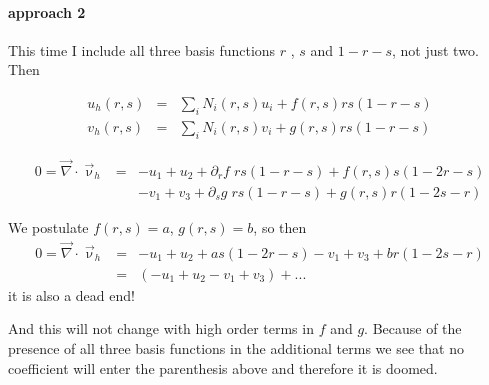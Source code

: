 \paragraph{approach 2} This time I include all three basis functions $r$ , $s$ and $1-r-s$, not just two. Then

\begin{eqnarray}
u_h(r,s)&=&\sum_i N_i(r,s) u_i + f(r,s) rs(1-r-s) \\
v_h(r,s)&=&\sum_i N_i(r,s) v_i + g(r,s) rs(1-r-s) 
\end{eqnarray}

\begin{eqnarray}
0=\vec\nabla\cdot\vec\upnu_h 
&=& 
  -u_1+u_2 + \partial_r f \; rs(1-r-s) + f(r,s)s(1-2r-s) \\
&&-v_1+v_3 + \partial_s g \; rs(1-r-s) + g(r,s)r(1-2s-r)
\end{eqnarray}


We postulate $f(r,s)=a$, $g(r,s)=b$, so then 
\begin{eqnarray}
0=\vec\nabla\cdot\vec\upnu_h 
&=&   -u_1+u_2 +  as(1-2r-s) -v_1+v_3 +  br(1-2s-r) \\
&=&  (-u_1+u_2 -v_1+v_3) + ...
\end{eqnarray}
it is also a dead end!

And this will not change with high order terms in $f$ and $g$. Because of the presence of all three 
basis functions in the additional terms we see that no 
coefficient will enter the parenthesis above and therefore it is doomed. 














